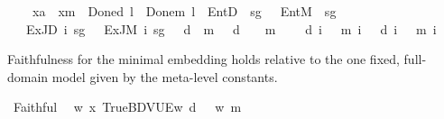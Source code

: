 \begin{isabellebody}
\ \ \ \ {\isachardoublequoteopen}{\isasymlceil}x\isactrlsup a{\isasymrceil}\ {\isacharequal}{\kern0pt}\ x\isactrlsup m{\isachardoublequoteclose}\ {\isacharbar}{\kern0pt}\ {\isachardoublequoteopen}{\isasymlceil}Done\isactrlsup d\ l{\isasymrceil}\ {\isacharequal}{\kern0pt}\ Done\isactrlsup m\ l{\isachardoublequoteclose}\ {\isacharbar}{\kern0pt}\ {\isachardoublequoteopen}{\isasymlceil}EntD\ {\isasymPhi}\ sg\ {\isasymphi}{\isasymrceil}\ {\isacharequal}{\kern0pt}\ EntM\ {\isasymPhi}\ sg\ {\isasymphi}{\isachardoublequoteclose}\isanewline
\ \ {\isacharbar}{\kern0pt}\ {\isachardoublequoteopen}{\isasymlceil}ExJD\ i\ sg\ {\isasymphi}{\isasymrceil}\ {\isacharequal}{\kern0pt}\ ExJM\ i\ sg\ {\isasymphi}{\isachardoublequoteclose}\ {\isacharbar}{\kern0pt}\ {\isachardoublequoteopen}{\isasymlceil}{\isasymnot}\isactrlsup d{\isasymphi}{\isasymrceil}\ {\isacharequal}{\kern0pt}\ {\isasymnot}\isactrlsup m{\isasymlceil}{\isasymphi}{\isasymrceil}{\isachardoublequoteclose}\ {\isacharbar}{\kern0pt}\ {\isachardoublequoteopen}{\isasymlceil}{\isasymphi}\ {\isasymsupset}\isactrlsup d\ {\isasympsi}{\isasymrceil}\ {\isacharequal}{\kern0pt}\ {\isasymlceil}{\isasymphi}{\isasymrceil}\ {\isasymsupset}\isactrlsup m\ {\isasymlceil}{\isasympsi}{\isasymrceil}{\isachardoublequoteclose}\isanewline
\ \ {\isacharbar}{\kern0pt}\ {\isachardoublequoteopen}{\isasymlceil}{\isasymB}\isactrlsup d\ i\ {\isasymphi}{\isasymrceil}\ {\isacharequal}{\kern0pt}\ {\isasymB}\isactrlsup m\ i\ {\isasymlceil}{\isasymphi}{\isasymrceil}{\isachardoublequoteclose}\ {\isacharbar}{\kern0pt}\ {\isachardoublequoteopen}{\isasymlceil}{\isasymD}\isactrlsup d\ i\ {\isasymphi}{\isasymrceil}\ {\isacharequal}{\kern0pt}\ {\isasymD}\isactrlsup m\ i\ {\isasymlceil}{\isasymphi}{\isasymrceil}{\isachardoublequoteclose}%
\begin{isamarkuptext}%
Faithfulness for the minimal embedding holds relative to the one fixed,
full-domain model given by the meta-level constants.%
\end{isamarkuptext}\isamarkuptrue%
\isamarkupfalse%
\ Faithful{}{\isacharcolon}{\kern0pt}\isanewline
\ \ {\isachardoublequoteopen}{\isasymforall}w{\isachardot}{\kern0pt}\ {\isasymlangle}{\isacharparenleft}{\kern0pt}{\isasymlambda}x{\isacharcolon}{\kern0pt}{\isacharcolon}{\kern0pt}{\isasymw}{\isachardot}{\kern0pt}\ True{\isacharparenright}{\kern0pt}{\isacharcomma}{\kern0pt}BDVUEw\ {\isasymTurnstile}\isactrlsup d\ {\isasymphi}\ {\isasymlongleftrightarrow}\ w\ {\isasymTurnstile}\isactrlsup m\ {\isasymlceil}{\isasymphi}{\isasymrceil}{\isachardoublequoteclose}\isanewline

\end{isabellebody}
